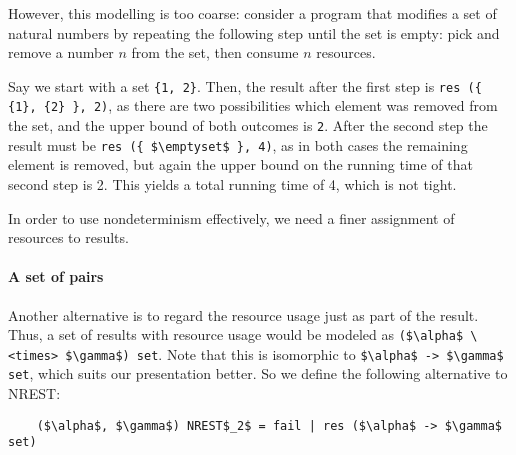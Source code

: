 \documentclass[acmsmall]{acmart}
\newcommand{\is}{\lstinline[language=isabelle]}
\begin{document}
However, this modelling is too coarse:
consider a program that modifies a set of natural numbers by repeating the following step until the set is empty:
pick and remove a number $n$ from the set, then consume $n$ resources.



Say we start with a set \is!{1, 2}!. Then, the result after the first step is \is!res ({ {1}, {2} }, 2)!, as there are two possibilities which element was removed from the set, and the upper bound of both outcomes is \is{2}. 
After the second step the result must be \is!res ({ $\emptyset$ }, 4)!, as in both cases the remaining element is removed, but again the upper bound on the running time of that second step is 2.
This yields a total running time of 4, which is not tight.
%
%

In order to use nondeterminism effectively, we need a finer assignment of resources to results.



\paragraph{A set of pairs}
Another alternative is to regard the resource usage just as part of the result. 
Thus, a set of results with resource usage would be modeled as \is{($\alpha$ \<times> $\gamma$) set}.
Note that this is isomorphic to \is{$\alpha$ -> $\gamma$ set}, which suits our presentation better.
%
%
So we define the following alternative to NREST:

\begin{lstlisting}
    ($\alpha$, $\gamma$) NREST$_2$ = fail | res ($\alpha$ -> $\gamma$ set)
\end{lstlisting}
\end{document}

